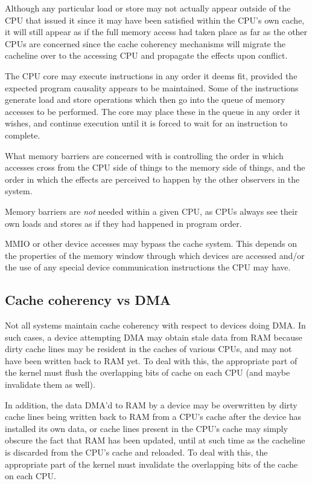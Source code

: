 Although any particular load or store may not actually appear outside of the
CPU that issued it since it may have been satisfied within the CPU's own cache,
it will still appear as if the full memory access had taken place as far as the
other CPUs are concerned since the cache coherency mechanisms will migrate the
cacheline over to the accessing CPU and propagate the effects upon conflict.

The CPU core may execute instructions in any order it deems fit, provided the
expected program causality appears to be maintained.  Some of the instructions
generate load and store operations which then go into the queue of memory
accesses to be performed.  The core may place these in the queue in any order
it wishes, and continue execution until it is forced to wait for an instruction
to complete.

What memory barriers are concerned with is controlling the order in which
accesses cross from the CPU side of things to the memory side of things, and
the order in which the effects are perceived to happen by the other observers
in the system.

\begin{Note}
Memory barriers are \emph{not} needed within a given CPU, as CPUs always see
their own loads and stores as if they had happened in program order.
\end{Note}

\begin{Note}
MMIO or other device accesses may bypass the cache system.
This depends on the properties of the memory window through which devices
are accessed and/or the use of any special device communication instructions
the CPU may have.
\end{Note}


\subsection{Cache coherency vs DMA}

Not all systems maintain cache coherency with respect to devices doing DMA\@.
In such cases, a device attempting DMA may obtain stale data from RAM because
dirty cache lines may be resident in the caches of various CPUs, and may not
have been written back to RAM yet.
To deal with this, the appropriate part of the kernel must flush the
overlapping bits of cache on each CPU (and maybe invalidate them as well).

In addition, the data DMA'd to RAM by a device may be overwritten by dirty
cache lines being written back to RAM from a CPU's cache after the device has
installed its own data, or cache lines present in the CPU's cache may simply
obscure the fact that RAM has been updated, until at such time as the cacheline
is discarded from the CPU's cache and reloaded.
To deal with this, the appropriate part of the kernel must invalidate the
overlapping bits of the cache on each CPU.

